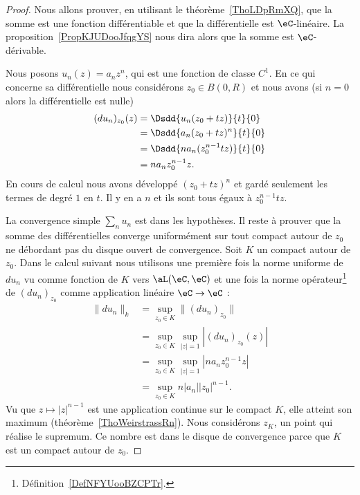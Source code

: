 \begin{proof}
	Nous allons prouver, en utilisant le théorème~\ref{ThoLDpRmXQ}, que la somme est une fonction différentiable et que la différentielle est \( \eC\)-linéaire. La proposition~\ref{PropKJUDooJfqgYS} nous dira alors que la somme est \( \eC\)-dérivable.

	Nous posons \( u_n(z)=a_nz^n\), qui est une fonction de classe \( C^1\). En ce qui concerne sa différentielle nous considérons \( z_0\in B(0,R)\)  et nous avons    (si \( n=0\) alors la différentielle est nulle)
	\begin{subequations}
		\begin{align}
			(du_n)_{z_0}(z) & =\Dsdd{ u_n(z_0+tz) }{t}{0}       \\
			                & =\Dsdd{ a_n(z_0+tz)^n }{t}{0}     \\
			                & =\Dsdd{ na_n(z_0^{n-1}tz) }{t}{0} \\
			                & =na_nz_0^{n-1}z.
		\end{align}
	\end{subequations}
	En cours de calcul nous avons développé \( (z_0+tz)^n\) et gardé seulement les termes de degré \( 1\) en \( t\). Il y en a \( n\) et ils sont tous égaux à \( z_0^{n-1}tz\).

	La convergence simple \( \sum_nu_n\) est dans les hypothèses. Il reste à prouver que la somme des différentielles converge uniformément sur tout compact autour de \( z_0\) ne débordant pas du disque ouvert de convergence. Soit \( K\) un compact autour de \( z_0\). Dans le calcul suivant nous utilisons une première fois la norme uniforme de \( du_n\) vu comme fonction de \( K\) vers \( \aL(\eC,\eC)\) et une fois la norme opérateur\footnote{Définition~\ref{DefNFYUooBZCPTr}.} de \( (du_n)_{z_0}\) comme application linéaire \( \eC\to \eC\) :
	\begin{subequations}
		\begin{align}
			\| du_n \|_k & =\sup_{z_0\in K}\| (du_n)_{z_0} \|                \\
			             & =\sup_{z_0\in K}\sup_{| z |=1}| (du_n)_{z_0}(z) | \\
			             & =\sup_{z_0\in K}\sup_{| z |=1}| na_nz_0^{n-1}z |  \\
			             & =\sup_{z_0\in K}n| a_n | |z_0 |^{n-1}.
		\end{align}
	\end{subequations}
	Vu que \( z\mapsto| z |^{n-1}\) est une application continue sur le compact \( K\), elle atteint son maximum (théorème~\ref{ThoWeirstrassRn}). Nous considérons \( z_K\), un point qui réalise le supremum. Ce nombre est dans le disque de convergence parce que \( K\) est un compact autour de \( z_0\).


\end{proof}
